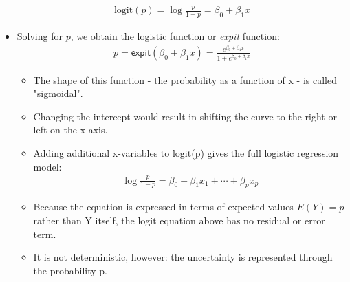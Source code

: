 \documentclass[12pt, oneside]{article}
\begin{document}
\begin{itemize}
    \begin{align*}
        \text{logit}(p) = \log \frac{p}{1-p} = \beta_0 + \beta_1x
    \end{align*}
    \item Solving for $p$, we obtain the logistic function or \emph{expit} function:
    \begin{align*}
        p = \textsf{expit}(\beta_0 + \beta_1x) = \frac{e^{\beta_0 + \beta_1x}}{1 + e^{\beta_0 + \beta_1x}}
    \end{align*}
    \begin{itemize}
        \item The shape of this function - the probability as a function of x - is called "sigmoidal".
        \item Changing the intercept would result in shifting the curve to the right or left on the x-axis.
        \item Adding additional x-variables to logit(p) gives the full logistic regression model:
        \begin{align*}
            \log \frac{p}{1-p} = \beta_0 + \beta_1x_1 + \dotsb + \beta_px_p
        \end{align*}
        \item Because the equation is expressed in terms of expected values $E(Y) = p$ rather than Y itself, the logit equation above has no residual or error term.
        \item It is not deterministic, however: the uncertainty is represented through the probability p.
    \end{itemize}
\end{itemize}
\end{document}
